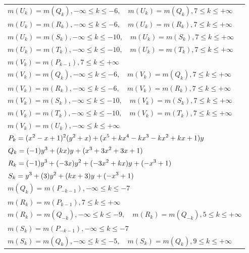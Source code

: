 \documentclass{amsart}
\begin{document}
\begin{longtable}{|l|}
\(\displaystyle m(U_k) = m(Q_{k}),-\infty \leqslant k \leqslant -6,\quad m(U_k) = m(Q_{k}),7 \leqslant k \leqslant +\infty\)\\
\(\displaystyle m(U_k) = m(R_{k}),-\infty \leqslant k \leqslant -6,\quad m(U_k) = m(R_{k}),7 \leqslant k \leqslant +\infty\)\\
\(\displaystyle m(U_k) = m(S_{k}),-\infty \leqslant k \leqslant -10,\quad m(U_k) = m(S_{k}),7 \leqslant k \leqslant +\infty\)\\
\(\displaystyle m(U_k) = m(T_{k}),-\infty \leqslant k \leqslant -10,\quad m(U_k) = m(T_{k}),7 \leqslant k \leqslant +\infty\)\\
\(\displaystyle m(V_k) = m(P_{k
 - 1}),7 \leqslant k \leqslant +\infty\)\\
\(\displaystyle m(V_k) = m(Q_{k}),-\infty \leqslant k \leqslant -6,\quad m(V_k) = m(Q_{k}),7 \leqslant k \leqslant +\infty\)\\
\(\displaystyle m(V_k) = m(R_{k}),-\infty \leqslant k \leqslant -6,\quad m(V_k) = m(R_{k}),7 \leqslant k \leqslant +\infty\)\\
\(\displaystyle m(V_k) = m(S_{k}),-\infty \leqslant k \leqslant -10,\quad m(V_k) = m(S_{k}),7 \leqslant k \leqslant +\infty\)\\
\(\displaystyle m(V_k) = m(T_{k}),-\infty \leqslant k \leqslant -10,\quad m(V_k) = m(T_{k}),7 \leqslant k \leqslant +\infty\)\\
\(\displaystyle m(V_k) = m(U_{k}),-\infty \leqslant k \leqslant +\infty\)\\
\hline
\(\displaystyle P_k=(x^2
 - x
 + 1)^{2}(y^2+x)+(x^5
 + k\*x^4
 - k\*x^3
 - k\*x^2
 + k\*x
 + 1)y\)\\
\(\displaystyle Q_k=(-1)y^{3}+(k\*x)y^{}+(x^3
 + 3\*x^2
 + 3\*x
 + 1)\)\\
\(\displaystyle R_k=(-1)y^{3}+(-3\*x)y^{2}+(-3\*x^2
 + k\*x)y^{}+(-x^3
 + 1)\)\\
\(\displaystyle S_k=y^{3}+(3)y^{2}+(k\*x
 + 3)y^{}+(-x^3
 + 1)\)\\
\(\displaystyle m(Q_k) = m(P_{-k
 - 1}),-\infty \leqslant k \leqslant -7\)\\
\(\displaystyle m(R_k) = m(P_{k
 - 1}),7 \leqslant k \leqslant +\infty\)\\
\(\displaystyle m(R_k) = m(Q_{-k}),-\infty \leqslant k \leqslant -9,\quad m(R_k) = m(Q_{-k}),5 \leqslant k \leqslant +\infty\)\\
\(\displaystyle m(S_k) = m(P_{-k
 - 1}),-\infty \leqslant k \leqslant -7\)\\
\(\displaystyle m(S_k) = m(Q_{k}),-\infty \leqslant k \leqslant -5,\quad m(S_k) = m(Q_{k}),9 \leqslant k \leqslant +\infty\)\\

\end{longtable}
\end{document}
